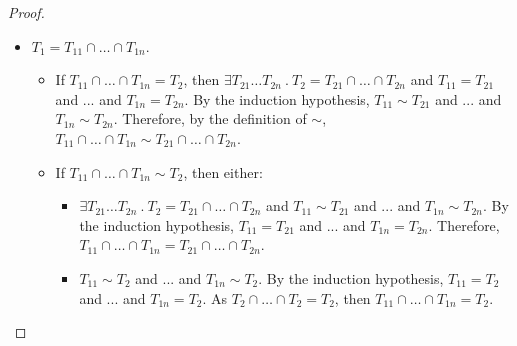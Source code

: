 \documentclass[a4paper]{article}
\begin{document}
\begin{proof}
\begin{itemize}
    \item $T_1 = T_{11} \cap \ldots \cap T_{1n}$.
    \begin{itemize}
        \item If $T_{11} \cap \ldots \cap T_{1n} = T_2$, then $\exists T_{21} \ldots T_{2n}\ .\ T_2 = T_{21} \cap \ldots \cap T_{2n}$ and $T_{11} = T_{21}$ and ... and $T_{1n} = T_{2n}$.
        By the induction hypothesis, $T_{11} \sim T_{21}$ and ... and $T_{1n} \sim T_{2n}$.
        Therefore, by the definition of $\sim$, $T_{11} \cap \ldots \cap T_{1n} \sim T_{21} \cap \ldots \cap T_{2n}$.
        \item If $T_{11} \cap \ldots \cap T_{1n} \sim T_2$, then either:
        \begin{itemize}
            \item $\exists T_{21} \ldots T_{2n}\ .\ T_2 = T_{21} \cap \ldots \cap T_{2n}$ and $T_{11} \sim T_{21}$ and ... and $T_{1n} \sim T_{2n}$.
            By the induction hypothesis, $T_{11} = T_{21}$ and ... and $T_{1n} = T_{2n}$.
            Therefore, $T_{11} \cap \ldots \cap T_{1n} = T_{21} \cap \ldots \cap T_{2n}$.
            \item $T_{11} \sim T_2$ and ... and $T_{1n} \sim T_2$.
            By the induction hypothesis, $T_{11} = T_2$ and ... and $T_{1n} = T_2$.
            As $T_2 \cap \ldots \cap T_2 = T_2$, then $T_{11} \cap \ldots \cap T_{1n} = T_2$.
        \end{itemize}
    \end{itemize}
\end{itemize}
\end{proof}
\end{document}
